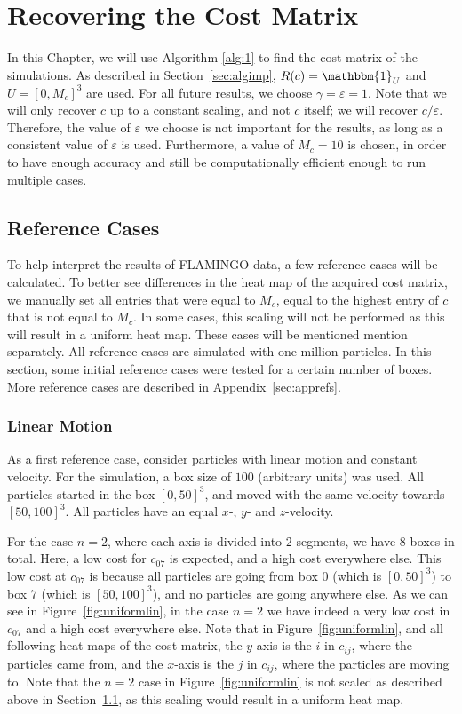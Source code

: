 \chapter{Recovering the Cost Matrix}
\label{ch:results}
In this Chapter, we will use Algorithm \ref{alg:1} to find the cost matrix of the simulations. As described in Section~\ref{sec:algimp}, $R(c) = \mathbbm{1}_U$ and $U = [0, M_c]^3$ are used. For all future results, we choose $\gamma = \varepsilon = 1$. Note that we will only recover $c$ up to a constant scaling, and not $c$ itself; we will recover $c/\varepsilon$. Therefore, the value of $\varepsilon$ we choose is not important for the results, as long as a consistent value of $\varepsilon$ is used. Furthermore, a value of $M_c = 10$ is chosen, in order to have enough accuracy and still be computationally efficient enough to run multiple cases. 

\section{Reference Cases}
\label{sec:refs}
To help interpret the results of FLAMINGO data, a few reference cases will be calculated. To better see differences in the heat map of the acquired cost matrix, we manually set all entries that were equal to $M_c$, equal to the highest entry of $c$ that is not equal to $M_c$. In some cases, this scaling will not be performed as this will result in a uniform heat map. These cases will be mentioned mention separately. All reference cases are simulated with one million particles. In this section, some initial reference cases were tested for a certain number of boxes. More reference cases are described in Appendix~\ref{sec:apprefs}.

\subsection{Linear Motion}
As a first reference case, consider particles with linear motion and constant velocity. For the simulation, a box size of $100$ (arbitrary units) was used. All particles started in the box $[0, 50]^3$, and moved with the same velocity towards $[50,100]^3$. All particles have an equal $x$-, $y$- and $z$-velocity. \par 
For the case $n=2$, where each axis is divided into $2$ segments, we have $8$ boxes in total. Here, a low cost for $c_{07}$ is expected, and a high cost everywhere else. This low cost at $c_{07}$ is because all particles are going from box $0$ (which is $[0, 50]^3$) to box $7$ (which is $[50, 100]^3$), and no particles are going anywhere else. As we can see in Figure~\ref{fig:uniformlin}, in the case $n=2$ we have indeed a very low cost in $c_{07}$ and a high cost everywhere else. Note that in Figure~\ref{fig:uniformlin}, and all following heat maps of the cost matrix, the $y$-axis is the $i$ in $c_{ij}$, where the particles came from, and the $x$-axis is the $j$ in $c_{ij}$, where the particles are moving to. Note that the $n=2$ case in Figure~\ref{fig:uniformlin} is not scaled as described above in Section~\ref{sec:refs}, as this scaling would result in a uniform heat map.\par 

